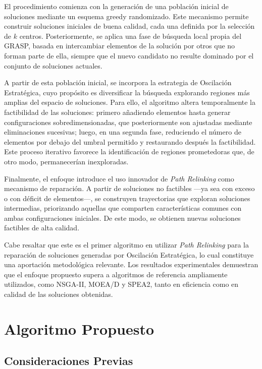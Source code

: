 \documentclass[12pt,a4paper]{book}
\begin{document}
El procedimiento comienza con la generación de una población inicial de soluciones mediante un esquema greedy randomizado. Este mecanismo permite construir soluciones iniciales de buena calidad, cada una definida por la selección de $k$ centros. Posteriormente, se aplica una fase de búsqueda local propia del GRASP, basada en intercambiar elementos de la solución por otros que no forman parte de ella, siempre que el nuevo candidato no resulte dominado por el conjunto de soluciones actuales.

A partir de esta población inicial, se incorpora la estrategia de Oscilación Estratégica, cuyo propósito es diversificar la búsqueda explorando regiones más amplias del espacio de soluciones. Para ello, el algoritmo altera temporalmente la factibilidad de las soluciones: primero añadiendo elementos hasta generar configuraciones sobredimensionadas, que posteriormente son ajustadas mediante eliminaciones sucesivas; luego, en una segunda fase, reduciendo el número de elementos por debajo del umbral permitido y restaurando después la factibilidad.
Este proceso iterativo favorece la identificación de regiones prometedoras que, de otro modo, permanecerían inexploradas.

Finalmente, el enfoque introduce el uso innovador de \emph{Path Relinking} como mecanismo de reparación. A partir de soluciones no factibles —ya sea con exceso o con déficit de elementos—, se construyen trayectorias que exploran soluciones intermedias, priorizando aquellas que comparten características comunes con ambas configuraciones iniciales. De este modo, se obtienen nuevas soluciones factibles de alta calidad.

Cabe resaltar que este es el primer algoritmo en utilizar \emph{Path Relinking} para la reparación de soluciones generadas por Oscilación Estratégica, lo cual constituye una aportación metodológica relevante. Los resultados experimentales demuestran que el enfoque propuesto supera a algoritmos de referencia ampliamente utilizados, como NSGA-II, MOEA/D y SPEA2, tanto en eficiencia como en calidad de las soluciones obtenidas.

\section{Algoritmo Propuesto}

\subsection{Consideraciones Previas}
\end{document}
